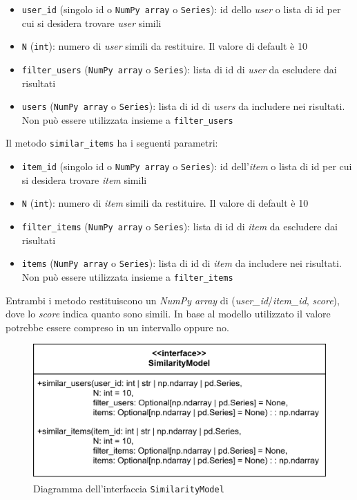 \begin{itemize}
    \item \texttt{user\_id} (singolo id o \texttt{NumPy array} o \texttt{Series}): id dello \textit{user} o lista di id per cui si desidera trovare \textit{user} simili
    \item \texttt{N} (\texttt{int}): numero di \textit{user} simili da restituire. Il valore di default è 10
    \item \texttt{filter\_users} (\texttt{NumPy array} o \texttt{Series}): lista di id di \textit{user} da escludere dai risultati
    \item \texttt{users} (\texttt{NumPy array} o \texttt{Series}): lista di id di \textit{users} da includere nei risultati. Non può essere utilizzata insieme a \texttt{filter\_users}
\end{itemize}

Il metodo \texttt{similar\_items} ha i seguenti parametri:
\begin{itemize}
    \item \texttt{item\_id} (singolo id o \texttt{NumPy array} o \texttt{Series}): id dell'\textit{item} o lista di id per cui si desidera trovare \textit{item} simili
    \item \texttt{N} (\texttt{int}): numero di \textit{item} simili da restituire. Il valore di default è 10
    \item \texttt{filter\_items} (\texttt{NumPy array} o \texttt{Series}): lista di id di \textit{item} da escludere dai risultati
    \item \texttt{items} (\texttt{NumPy array} o \texttt{Series}): lista di id di \textit{item} da includere nei risultati. Non può essere utilizzata insieme a \texttt{filter\_items}
\end{itemize}

Entrambi i metodo restituiscono un \textit{NumPy array} di (\textit{user\_id}/\textit{item\_id}, \textit{score}), dove lo \textit{score} indica quanto sono simili. In base al modello utilizzato il valore potrebbe essere compreso in un intervallo oppure no.

\begin{figure}[htbp]
    \centering
    \includegraphics[scale=0.25]{figures/UML/models/similarity_model.png}
    \caption{Diagramma dell'interfaccia \texttt{SimilarityModel}}
\end{figure}

